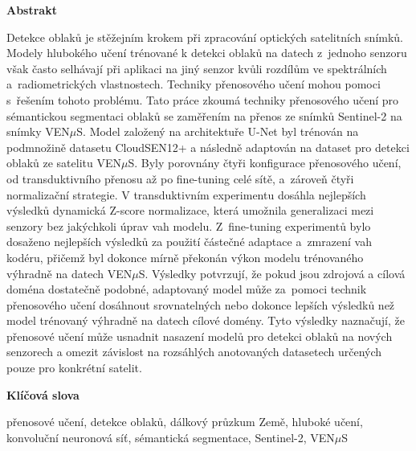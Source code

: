 \vfil\vfil\vfil\null

\clearpage
\thispagestyle{plain}
\null\vfil

\begin{center}
{\huge\bfseries{Abstrakt} \par}
\bigskip
\end{center}
Detekce oblaků je stěžejním krokem při zpracování optických satelitních snímků. Modely hlubokého učení trénované k detekci oblaků na datech z~jednoho senzoru však často selhávají při aplikaci na jiný senzor kvůli rozdílům ve spektrálních a~radiometrických vlastnostech. Techniky přenosového učení mohou pomoci s~řešením tohoto problému. Tato práce zkoumá techniky přenosového učení pro sémantickou segmentaci oblaků se zaměřením na přenos ze snímků Sentinel-2 na snímky VEN$\mu$S. Model založený na architektuře U-Net byl trénován na podmnožině datasetu CloudSEN12+ a následně adaptován na dataset pro detekci oblaků ze satelitu VEN$\mu$S. Byly porovnány čtyři konfigurace přenosového učení, od transduktivního přenosu až po fine-tuning celé sítě, a~zároveň čtyři normalizační strategie. V transduktivním experimentu dosáhla nejlepších výsledků dynamická Z-score normalizace, která umožnila generalizaci mezi senzory bez jakýchkoli úprav vah modelu. Z~fine-tuning experimentů bylo dosaženo nejlepších výsledků za použití částečné adaptace a~zmrazení vah kodéru, přičemž byl dokonce mírně překonán výkon modelu trénovaného výhradně na datech VEN$\mu$S. Výsledky potvrzují, že pokud jsou zdrojová a cílová doména dostatečně podobné, adaptovaný model může za~pomoci technik přenosového učení dosáhnout srovnatelných nebo dokonce lepších výsledků než model trénovaný výhradně na datech cílové domény. Tyto výsledky naznačují, že přenosové učení může usnadnit nasazení modelů pro detekci oblaků na nových senzorech a omezit závislost na rozsáhlých anotovaných datasetech určených pouze pro konkrétní satelit.

\begin{center}
{\large\bfseries{Klíčová slova} \par}
\bigskip
\end{center}
\noindent přenosové učení, detekce oblaků, dálkový průzkum Země, hluboké učení, konvoluční neuronová síť, sémantická segmentace, Sentinel-2, VEN$\mu$S

\vfil\vfil\vfil\null
\clearpage